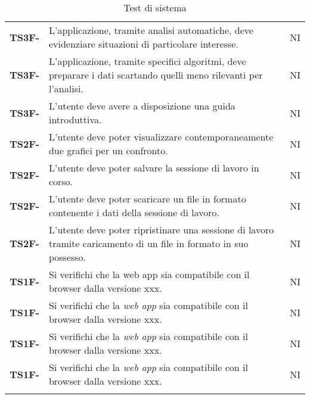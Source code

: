 \begin{longtable}{ c|C{12cm}|c }
\textbf{TS3F-} & 
L'applicazione, tramite analisi automatiche, deve evidenziare situazioni di particolare interesse. & 
NI\\

\textbf{TS3F-} & 
L'applicazione, tramite specifici algoritmi, deve preparare i dati scartando quelli meno rilevanti per l'analisi. & 
NI\\

\textbf{TS3F-} & 
L'utente deve avere a disposizione una guida introduttiva. & 
NI\\

\textbf{TS2F-} & 
L'utente deve poter visualizzare contemporaneamente due grafici per un confronto. & 
NI\\

\textbf{TS2F-} & 
L'utente deve poter salvare la sessione di lavoro in corso. & 
NI\\

\textbf{TS2F-} & 
L'utente deve poter scaricare un file in formato  contenente i dati della sessione di lavoro. & 
NI\\

\textbf{TS2F-} & 
L'utente deve poter ripristinare una sessione di lavoro tramite caricamento di un file in formato  in suo possesso. & 
NI\\

\textbf{TS1F-} & 
Si verifichi che la web app sia compatibile con il browser  dalla versione xxx. & 
NI\\

\textbf{TS1F-} & 
Si verifichi che la \textit{web app} sia compatibile con il browser  dalla versione xxx. & 
NI\\

\textbf{TS1F-} & 
Si verifichi che la \textit{web app} sia compatibile con il browser  dalla versione xxx. & 
NI\\

\textbf{TS1F-} & 
Si verifichi che la \textit{web app} sia compatibile con il browser  dalla versione xxx. & 
NI\\
		   
\caption{Test di sistema}
\label{testSistema}
\end{longtable}

